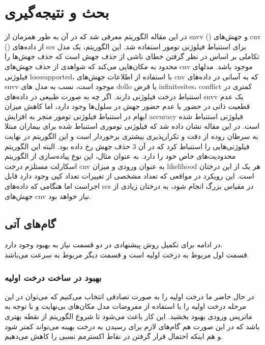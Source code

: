 
\chapter{بحث و نتیجه‌گیری}


در این مقاله الگوریتم  معرفی شد که در آن به طور همزمان از \gls{snvv} () و جهش‌های \gls{cnv} () از داده‌های \gls{scs} برای استنباط فیلوژنی تومور استفاده شد. این الگوریتم، یک مدل تکاملی بر اساس در نظر گرفتن خطای ناشی از حذف جهش است که حذف جهش‌ها را محدود به مکان‌هایی می‌کند که شواهدی از حذف جهش‌های \gls{cnv} موجود باشد. مدلهای فیلوژنی \gls{losssupported}،  با استفاده از اطلاعات جهش‌های \gls{cnv} که به آسانی در داده‌های \gls{snvv} موجود است، نسب به مدل های \gls{dollo} یا فرض \gls{infinitesites}، \gls{conflict} کمتری در استنباط درخت فیلوژنی دارند. اگر چه به صورت طبیعی در داده‌های \gls{snvv} یک عدم قطعیت ذاتی در حضور یا عدم حضور جهش در سلول‌ها وجود دارد، اما کاهش میزان ابهام در استنباط فیلوژنی تومور منجر به افزایش \gls{accuracy} فیلوژنی استنباط شده است. در این مقاله نشان داده شد که فیلوژنی توموری استنباط شده برای بیماران مبتلا به سرطان روده از دقت و تکرارپذیری بیشتری برخوردار است و این الگوریتم در نهایت فیلوژنی‌هایی را استنباط کرد که در آن 3 حذف جهش رخ داده بود. البته این الگوریتم محدودیت‌های خاص خود را دارد. به عنوان مثال، این نوع پیاده‌سازی از الگوریتم اسکارلت مستلزم درخت \gls{cnv} به عنوان ورودی و میزان \gls{likelihood} هر یک از این درختان است. این رویکرد در مواقعی که تعداد مشخصی از تغییرات تعداد کپی وجود دارد قابل اجراست اما هنگامی که داده‌های \gls{scs} در مقیاس بزرگ انجام شود، به درختان زیادی از جهش‌های \gls{cnv} نیاز خواهد بود. 

\section{گام‌های آتی}
در ادامه برای تکمیل روش پیشنهادی در دو قسمت نیاز به بهبود وجود دارد.\\
قسمت اول مربوط به درخت اولیه است و قسمت دیگر مربوط به سرعت  می‌باشد.
\subsection{بهبود در ساخت درخت اولیه}
در حال حاضر ما درخت اولیه را به صورت تصادفی انتخاب می‌کنیم که می‌توان در این مرحله درخت اولیه را با استفاده از مفروضات مدل مکان‌های بی‌نهایت و با توجه به ماتریس ورودی بهبود بخشید. این کار باعث می‌شود تا شروع الگوریتم از نقطه بهتری باشد که در این صورت هم گام‌های لازم برای رسیدن به درخت بهینه می‌تواند کمتر شود و هم اینکه احتمال قرار گرفتن در نقاط اکسترمم نسبی را کاهش می‌دهیم.

